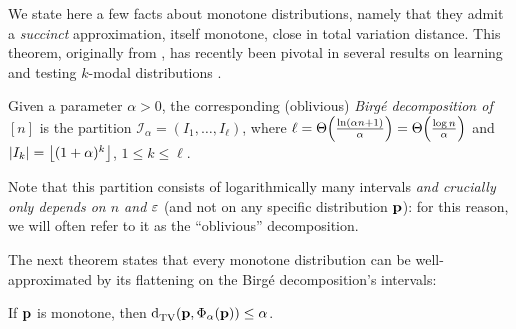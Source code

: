 We state here a few facts about monotone distributions, namely that they admit a \emph{succinct} approximation, itself monotone, close in total variation distance. This theorem, originally from \cite{Birge:87}, has recently been pivotal in several results on learning and testing $k$-modal distributions \cite{DDS:12,DDSVV:13}. 
\begin{definition}\label{def:birge:decomposition}
  Given a parameter $\alpha>0$, the corresponding (oblivious) \emph{Birg\'e decomposition of $[n]$} is the partition $\mathcal{I}_\alpha=(I_1,\dots,I_\ell)$, where $\ell=\bigTheta{\frac{\ln( \alpha n + 1)}{\alpha}}=\bigTheta{\frac{\log n }{\alpha}}$ and $\abs{I_{k}}=\flr{(1+\alpha)^k}$, $1\leq k \leq \ell$. 
\end{definition}
Note that this partition consists of logarithmically many intervals \emph{and crucially only depends on $n$ and $\eps$} (and not on any specific distribution $\D$): for this reason, we will often refer to it as the ``oblivious'' decomposition.

The next theorem states that every monotone distribution can be well-approximated by its flattening on the Birg\'e decomposition's intervals:     
\begin{theorem}\label{theorem:Birge:obl:decomp}
 If $\D$ is monotone, then $\totalvardist{\D}{\birge[\D]{\alpha}} \leq \alpha$.
\end{theorem}


